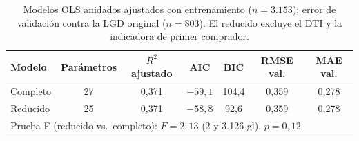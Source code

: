 \begin{table}[H]
  \centering\small
  \caption{Modelos OLS anidados ajustados con entrenamiento ($n = 3.153$); error de
  validación contra la LGD original ($n = 803$). El reducido excluye el DTI y la
  indicadora de primer comprador.}
  \begin{tabular}{lcccccc}
    \toprule
    Modelo & Parámetros & $R^2$ ajustado & AIC & BIC & RMSE val. & MAE val. \\
    \midrule
    Completo & 27 & 0,371 & $-59{,}1$ & 104,4 & 0,359 & 0,278 \\
    Reducido & 25 & 0,371 & $-58{,}8$ & 92,6 & 0,359 & 0,278 \\
    \midrule
    \multicolumn{7}{l}{Prueba F (reducido vs.\ completo): $F = 2{,}13$ (2 y 3.126 gl), $p = 0{,}12$} \\
    \bottomrule
  \end{tabular}
\end{table}
